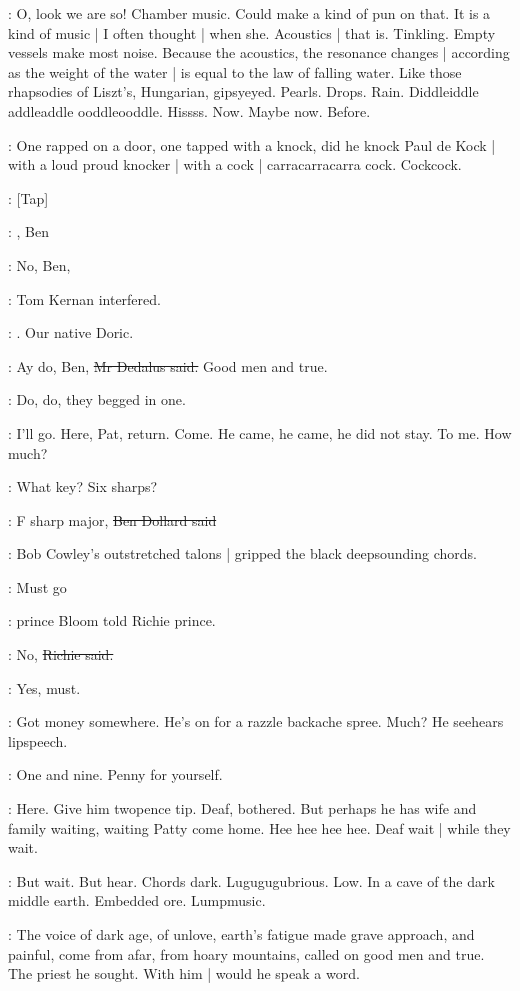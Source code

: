 \BloomInt:
O,
look we are so!
Chamber music.
Could make a kind of pun on that.
It is a kind of music |
I often thought |
when she.
Acoustics |
that is.
Tinkling.
Empty vessels make most noise.
Because the acoustics,
the resonance changes |
according as the weight of the water |
is equal to the law of falling water.
Like those rhapsodies of Liszt's,
Hungarian,
gipsyeyed.
Pearls.
Drops.
Rain.
Diddleiddle addleaddle ooddleooddle.
Hissss.
Now.
Maybe now.
Before.

\BloomInt:
One rapped on a door,
one tapped with a knock,
did he knock Paul de Kock |
with a loud proud knocker |
with a cock |
carracarracarra cock.
Cockcock.

\stripling:
[Tap]

\cowley:
,
Ben

:
No, Ben,

:
Tom Kernan interfered.

:
.
Our native Doric.

\simon:
Ay do,
Ben,
\sout{Mr Dedalus said.}
Good men and true.

:
Do,
do,
they begged in one.

\BloomInt:
I'll go.
Here,
Pat,
return.
Come.
He came,
he came,
he did not stay.
To me.
How much?

\cowley:
What key?
Six sharps?

\dollard:
F sharp major,
\sout{Ben Dollard said}

:
Bob Cowley's outstretched talons |
gripped the black deepsounding chords.

\Bloom:
Must go

:
prince Bloom told Richie prince.

\goulding:
No,
\sout{Richie said.}

\Bloom:
Yes,
must.

\BloomInt:
Got money somewhere.
He's on for a razzle backache spree.
Much?
He seehears lipspeech.

\Bloom:
One and nine.
Penny for yourself.

\BloomInt:
Here.
Give him twopence tip.
Deaf,
bothered.
But perhaps he has wife and family waiting,
waiting Patty come home.
Hee hee hee hee.
Deaf wait |
while they wait.

\BloomInt:
But wait.
But hear.
Chords dark.
Lugugugubrious.
Low.
In a cave of the dark middle earth.
Embedded ore.
Lumpmusic.

:
The voice of dark age,
of unlove,
earth's fatigue made grave approach,
and painful,
come from afar,
from hoary mountains,
called on good men and true.
The priest he sought.
With him |
would he speak a word.

